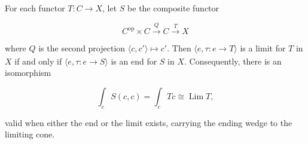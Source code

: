 For each functor $T: C \rightarrow X$, let $S$ be the composite functor

$$C^{\text{op}} \times C \xrightarrow{Q} C \xrightarrow{T} X$$

where $Q$ is the second projection $\langle c, c' \rangle \mapsto c'$. Then $\langle e, \tau: e \rightarrow T \rangle$ is a limit for $T$ in $X$ if and only if $\langle e, \tau: e \mathbin{\dot{\rightarrow}} S \rangle$ is an end for $S$ in $X$. Consequently, there is an isomorphism

$$\int_c S(c, c) = \int_c Tc \cong \operatorname{Lim} T,$$

valid when either the end or the limit exists, carrying the ending wedge to the limiting cone.
